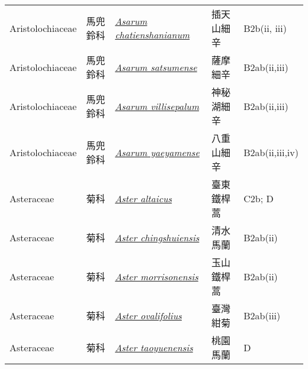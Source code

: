 {\begin{longtable}{L{2.5cm}L{2cm}L{5cm}L{2.5cm}L{3cm}}
    Aristolochiaceae & 馬兜鈴科 & \href{http://www.theplantlist.org/tpl1.1/search?q=Asarum+chatienshanianum}{\textit{Asarum chatienshanianum} } & 插天山細辛 & B2b(ii, iii)    \\
    Aristolochiaceae & 馬兜鈴科 & \href{http://www.theplantlist.org/tpl1.1/search?q=Asarum+satsumense}{\textit{Asarum satsumense} } & 薩摩細辛 & B2ab(ii,iii)    \\
    Aristolochiaceae & 馬兜鈴科 & \href{http://www.theplantlist.org/tpl1.1/search?q=Asarum+villisepalum}{\textit{Asarum villisepalum} } & 神秘湖細辛 & B2ab(ii,iii)    \\
    Aristolochiaceae & 馬兜鈴科 & \href{http://www.theplantlist.org/tpl1.1/search?q=Asarum+yaeyamense}{\textit{Asarum yaeyamense} } & 八重山細辛 & B2ab(ii,iii,iv)    \\
    Asteraceae & 菊科 & \href{http://www.theplantlist.org/tpl1.1/search?q=Aster+altaicus}{\textit{Aster altaicus} } & 臺東鐵桿蒿 & C2b; D    \\
    Asteraceae & 菊科 & \href{http://www.theplantlist.org/tpl1.1/search?q=Aster+chingshuiensis}{\textit{Aster chingshuiensis} } & 清水馬蘭 & B2ab(ii)    \\
    Asteraceae & 菊科 & \href{http://www.theplantlist.org/tpl1.1/search?q=Aster+morrisonensis}{\textit{Aster morrisonensis} } & 玉山鐵桿蒿 & B2ab(ii)    \\
    Asteraceae & 菊科 & \href{http://www.theplantlist.org/tpl1.1/search?q=Aster+ovalifolius}{\textit{Aster ovalifolius} } & 臺灣紺菊 & B2ab(iii)    \\
    Asteraceae & 菊科 & \href{http://www.theplantlist.org/tpl1.1/search?q=Aster+taoyuenensis}{\textit{Aster taoyuenensis} } & 桃園馬蘭 & D    \\

\end{longtable}}
